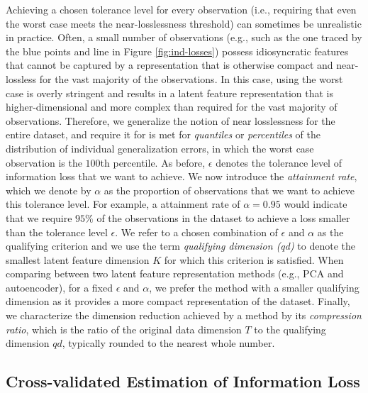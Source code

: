 Achieving a chosen tolerance level for every observation (i.e., requiring that even the worst case meets the near-losslessness threshold) can sometimes be unrealistic in practice.
Often, a small number of observations (e.g., such as the one traced by the blue points and line in Figure \ref{fig:ind-losses}) possess idiosyncratic features that cannot be captured by a representation that is otherwise compact and near-lossless for the vast majority of the observations.
In this case, using the worst case is overly stringent and results in a latent feature representation that is higher-dimensional and more complex than required for the vast majority of observations.
Therefore, we generalize the notion of near losslessness for the entire dataset, and require it for is met for \emph{quantiles} or \emph{percentiles} of the distribution of individual generalization errors, in which the worst case observation is the $100$th percentile. 
As before, $\epsilon$ denotes the tolerance level of information loss that we want to achieve.
We now introduce the \emph{attainment rate}, which we denote by $\alpha$ as the proportion of observations that we want to achieve this tolerance level.
For example, a attainment rate of $\alpha = 0.95$ would indicate that we require $95\%$ of the observations in the dataset to achieve a loss smaller than the tolerance level $\epsilon$.
We refer to a chosen combination of $\epsilon$ and $\alpha$ as the qualifying criterion and we use the term \emph{qualifying dimension (qd)} to denote the smallest latent feature dimension $K$ for which this criterion is satisfied.
When comparing between two latent feature representation methods (e.g., PCA and autoencoder), for a fixed $\epsilon$ and $\alpha$, we prefer the method with a smaller qualifying dimension as it provides a more compact representation of the dataset.
Finally, we characterize the dimension reduction achieved by a method by its \emph{compression ratio}, which is the ratio of the original data dimension $T$ to the qualifying dimension $qd$, typically rounded to the nearest whole number.

\subsection{Cross-validated Estimation of Information Loss}

